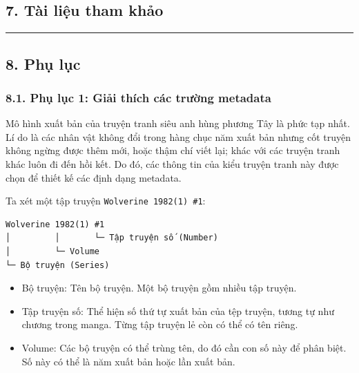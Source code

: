 \hypertarget{tuxe0i-liux1ec7u-tham-khux1ea3o}{%
  \subsection{\texorpdfstring{7. Tài liệu tham khảo
    }{7. Tài liệu tham khảo }}\label{tuxe0i-liux1ec7u-tham-khux1ea3o}}

\begin{center}\rule{0.5\linewidth}{0.5pt}\end{center}

\hypertarget{phux1ee5-lux1ee5c}{%
  \subsection{\texorpdfstring{8. Phụ lục
    }{8. Phụ lục }}\label{phux1ee5-lux1ee5c}}

\hypertarget{phux1ee5-lux1ee5c-1-giux1ea3i-thuxedch-cuxe1c-trux1b0ux1eddng-metadata}{%
  \subsubsection{\texorpdfstring{8.1. Phụ lục 1: Giải thích các trường
      metadata
    }{8.1. Phụ lục 1: Giải thích các trường metadata }}\label{phux1ee5-lux1ee5c-1-giux1ea3i-thuxedch-cuxe1c-trux1b0ux1eddng-metadata}}

Mô hình xuất bản của truyện tranh siêu anh hùng phương Tây là phức tạp
nhất. Lí do là các nhân vật không đổi trong hàng chục năm xuất bản nhưng
cốt truyện không ngừng được thêm mới, hoặc thậm chí viết lại; khác với
các truyện tranh khác luôn đi đến hồi kết. Do đó, các thông tin của kiểu
truyện tranh này được chọn để thiết kế các định dạng metadata.

Ta xét một tập truyện \texttt{Wolverine\ 1982(1)\ \#1}:

\begin{verbatim}
Wolverine 1982(1) #1
│         │       └─ Tập truyện số (Number)
│         └─ Volume
└─ Bộ truyện (Series)
\end{verbatim}

\begin{itemize}
  
  \item
        Bộ truyện: Tên bộ truyện. Một bộ truyện gồm nhiều tập truyện.
  \item
        Tập truyện số: Thể hiện số thứ tự xuất bản của tệp truyện, tương tự
        như chương trong manga. Từng tập truyện lẻ còn có thể có tên riêng.
  \item
        Volume: Các bộ truyện có thể trùng tên, do đó cần con số này để phân
        biệt. Số này có thể là năm xuất bản hoặc lần xuất bản.
\end{itemize}

